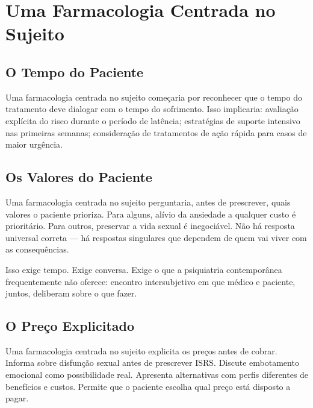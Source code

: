 \section{Uma Farmacologia Centrada no Sujeito}
\label{sec:farmacologia-sujeito}

\subsection{O Tempo do Paciente}

Uma farmacologia centrada no sujeito começaria por reconhecer que o tempo do tratamento deve dialogar com o tempo do sofrimento. Isso implicaria: avaliação explícita do risco durante o período de latência; estratégias de suporte intensivo nas primeiras semanas; consideração de tratamentos de ação rápida para casos de maior urgência.

\subsection{Os Valores do Paciente}

Uma farmacologia centrada no sujeito perguntaria, antes de prescrever, quais valores o paciente prioriza. Para alguns, alívio da ansiedade a qualquer custo é prioritário. Para outros, preservar a vida sexual é inegociável. Não há resposta universal correta --- há respostas singulares que dependem de quem vai viver com as consequências.

Isso exige tempo. Exige conversa. Exige o que a psiquiatria contemporânea frequentemente não oferece: encontro intersubjetivo em que médico e paciente, juntos, deliberam sobre o que fazer.

\subsection{O Preço Explicitado}

Uma farmacologia centrada no sujeito explicita os preços antes de cobrar. Informa sobre disfunção sexual antes de prescrever ISRS. Discute embotamento emocional como possibilidade real. Apresenta alternativas com perfis diferentes de benefícios e custos. Permite que o paciente escolha qual preço está disposto a pagar.


